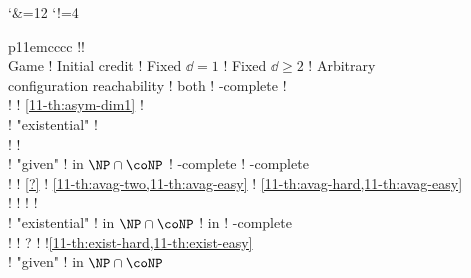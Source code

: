     \begin{landscape}%
      \centering
      \label{11-tbl:cmplx}
  \bigskip

  \begingroup
  \catcode`\&=12
  \catcode`!=4
  \ifstandalone
  \setlength{\tabcolsep}{3pt}
  \begin{tabular}{p{11em}cccc}
  \toprule 
  !!\\
  \cmidrule(l){3-5}
  Game ! Initial credit ! Fixed $\dd=1$ ! Fixed $\dd\geq 2$ ! Arbitrary\\
  \midrule
    configuration reachability%
    ! both
    ! \EXPSPACE-complete            
    !
  \\[-.5em]
    ! %
    ! {\tiny\cref{11-th:asym-dim1}} 
    !%
  \\
  \addlinespace
    ! "existential"
    ! 
  \\[-.5em]
    ! %
    ! 
  \\
    ! "given"      
    ! in $\NP\cap\coNP$             
    ! \EXP-complete
    ! \kEXP[2]-complete
  \\[-.5em]
    ! %
    ! {\tiny\cref{?}}                
    ! {\tiny\cref{11-th:avag-two,11-th:avag-easy}}
    ! {\tiny\cref{11-th:avag-hard,11-th:avag-easy}}
  \\[-.7em]
    ! %
    !
    !{\tiny\cite{Fahrenberg&Juhl&Larsen&Srba:2011,Courtois&Schmitz:2014}}
    !{\tiny\cite{Courtois&Schmitz:2014}}
  \\
  \addlinespace
    ! "existential"
    ! in $\NP\cap\coNP$             
    ! in \coNP
    ! \coNP-complete
  \\[-.5em]
    ! %
    ! {\tiny\cite{Chatterjee&Doyen:2012}?}
    !
    !{\tiny\cref{11-th:exist-hard,11-th:exist-easy}~\cite{Chatterjee&Doyen&Henzinger&Raskin:2010}}
  \\
    ! "given"
    ! in $\NP\cap\coNP$

\end{tabular}
\end{landscape}

